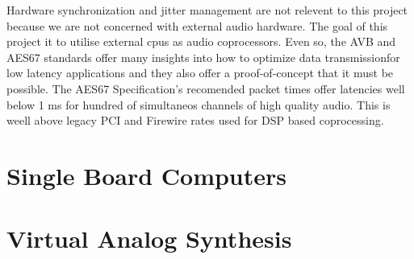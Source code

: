 Hardware synchronization and jitter management are not relevent to this project because we are not concerned with external audio hardware. The goal of this project it to utilise external cpus as audio coprocessors. Even so, the AVB and AES67 standards offer many insights into how to optimize data transmissionfor low latency applications and they also offer a proof-of-concept that it must be possible. The AES67 Specification's recomended packet times offer latencies well below 1 ms for hundred of simultaneos channels of high quality audio. This is weell above legacy PCI and Firewire rates used for DSP based coprocessing\cite{bouillot2009aes}.



\section{Single Board Computers}

\section{Virtual Analog Synthesis}